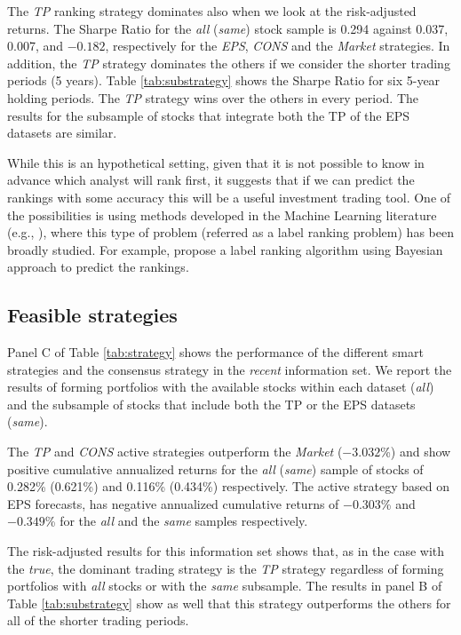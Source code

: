 \documentclass{article}\usepackage[]{graphicx}\usepackage[]{color}
\newcommand{\tr}{\textit{true}}
\newcommand{\naive}{\textit{recent}}
\newcommand{\same}{\textit{same}}
\newcommand{\all}{\textit{all}}
\begin{document}
{The \textit{TP} ranking strategy dominates also when we look at the risk-adjusted returns. The Sharpe Ratio for the \all{} (\same{}) stock sample is 0.294 against 0.037, 0.007, and \ensuremath{-0.182}, respectively for  the \textit{EPS}, \textit{CONS} and the \textit{Market} strategies. In addition, the \textit{TP} strategy dominates  the others if we consider the shorter trading periods (5 years). Table \ref{tab:substrategy} shows the Sharpe Ratio for six 5-year holding periods. The \textit{TP} strategy wins over the others in every period. The results for the subsample of stocks that integrate both the TP of the EPS datasets are similar.

While this is an hypothetical setting, given that it is not possible to know in advance which analyst will rank first, it suggests that if we can predict the rankings with some accuracy this will be a useful investment trading tool. One of the possibilities is using methods developed in the Machine Learning literature (e.g., \cite{aiguzhinov2010,brazdil2003}), where this type of problem (referred as a label ranking problem) has been broadly studied. For example, \cite{aiguzhinov2010} propose a label ranking algorithm using Bayesian approach to predict the rankings.



\subsection{Feasible strategies}
Panel C of Table \ref{tab:strategy} shows the performance of the different smart strategies and the consensus strategy in the \naive{} information set. We report the results of forming portfolios with the available stocks within each dataset (\all{}) and the subsample of stocks that include both the TP or the EPS datasets (\same{}).

The \textit{TP} and \textit{CONS} active strategies outperform the \textit{Market} (\ensuremath{-3.032}\%)  and show positive cumulative annualized returns for the \all{} (\same{}) sample of stocks of 0.282\% (0.621\%) and  0.116\% (0.434\%) respectively. The active strategy based on EPS forecasts, has negative annualized cumulative returns of  \ensuremath{-0.303}\% and \ensuremath{-0.349}\% for the \all{} and the \same{} samples respectively.

The risk-adjusted results for this information set shows that, as in the case with the \tr{}, the dominant trading strategy is the \textit{TP} strategy regardless of forming portfolios with \all{} stocks or with the \same{} subsample. 
The results in panel B of Table \ref{tab:substrategy} show as well that this strategy outperforms the others for all of the shorter trading periods.



}
\end{document}
